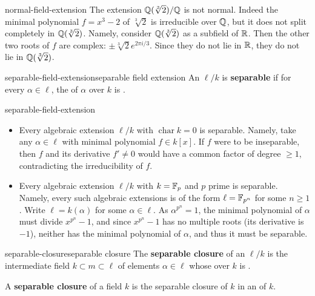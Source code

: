 \begin{example}{normal-field-extension}
    The extension $\mathbb{Q}(\sqrt[3]{2}) / \mathbb{Q}$ is not normal. Indeed the minimal polynomial $f = x^3 - 2$ of $\sqrt[3]{2}$ is irreducible over $\mathbb{Q}$, but it does not split completely in $\mathbb{Q}(\sqrt[3]{2})$. Namely, consider $\mathbb{Q}(\sqrt[3]{2})$ as a subfield of $\mathbb{R}$. Then the other two roots of $f$ are complex: $\pm \sqrt[3]{2} e^{2 \pi i / 3}$. Since they do not lie in $\mathbb{R}$, they do not lie in $\mathbb{Q}(\sqrt[3]{2})$.
\end{example}

\begin{topic}{separable-field-extension}{separable field extension}
    An   $\ell/k$ is \textbf{separable} if for every $\alpha \in \ell$, the  of $\alpha$ over $k$ is .
\end{topic}

\begin{example}{separable-field-extension}
\begin{itemize}
    \item Every algebraic extension $\ell/k$ with $\operatorname{char} k = 0$ is separable. Namely, take any $\alpha \in \ell$ with minimal polynomial $f \in k[x]$. If $f$ were to be inseparable, then $f$ and its derivative $f' \ne 0$ would have a common factor of degree $\ge 1$, contradicting the irreducibility of $f$. 
    \item Every algebraic extension $\ell/k$ with $k = \mathbb{F}_p$ and $p$ prime is separable. Namely, every such algebraic extensions is of the form $\ell = \mathbb{F}_{p^n}$ for some $n \ge 1$. Write $\ell = k(\alpha)$ for some $\alpha \in \ell$. As $\alpha^{p^n} = 1$, the minimal polynomial of $\alpha$ must divide $x^{p^n} - 1$, and since $x^{p^n} - 1$ has no multiple roots (its derivative is $-1$), neither has the minimal polynomial of $\alpha$, and thus it must be separable.
\end{itemize}
\end{example}

\begin{topic}{separable-closure}{separable closure}
    The \textbf{separable closure} of an  $\ell/k$ is the intermediate field $k \subset m \subset \ell$ of elements $\alpha \in \ell$ whose  over $k$ is .
    
    A \textbf{separable closure} of a field $k$ is the separable closure of $k$ in an  of $k$.
\end{topic}

